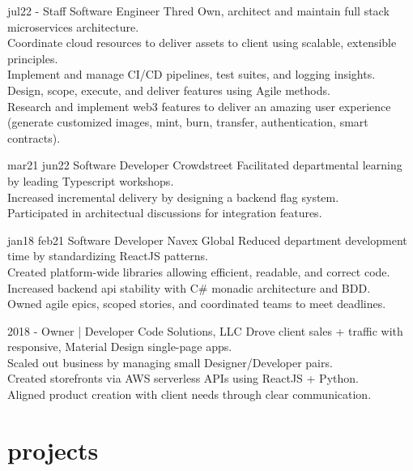 \documentclass[]{friggeri-cv}
\begin{document}
\begin{entrylist}
  \entry
    {jul22 -}
    {Staff Software Engineer}
    {Thred}
    {
      Own, architect and maintain full stack microservices architecture. \\
      Coordinate cloud resources to deliver assets to client using scalable, extensible principles. \\
      Implement and manage CI/CD pipelines, test suites, and logging insights. \\
      Design, scope, execute, and deliver features using Agile methods. \\
      Research and implement web3 features to deliver an amazing user experience (generate customized images, mint, burn, transfer, authentication, smart contracts). 
    }


  \entry 
    {mar21 jun22}
    {Software Developer}
    {Crowdstreet}
    {
    Facilitated departmental learning by leading Typescript workshops.\\
    Increased incremental delivery by designing a backend flag system. \\
    Participated in architectual discussions for integration features.
    }
  

  \entry 
    {jan18 feb21}
    {Software Developer}
    {Navex Global}
    {
    Reduced department development time by standardizing ReactJS patterns.\\
    Created platform-wide libraries allowing efficient, readable, and correct code.\\
    Increased backend api stability with C\# monadic architecture and BDD.\\
    Owned agile epics, scoped stories, and coordinated teams to meet deadlines.
    }
  
  \entry 
    {2018 - }
    {Owner | Developer}
    {Code Solutions, LLC}
    {
    Drove client sales + traffic with responsive, Material Design single-page apps. \\
    Scaled out business by managing small Designer/Developer pairs.\\
    Created storefronts via AWS serverless APIs using ReactJS + Python. \\
    Aligned product creation with client needs through clear communication.}

\end{entrylist}

\section{projects}
\end{document}
